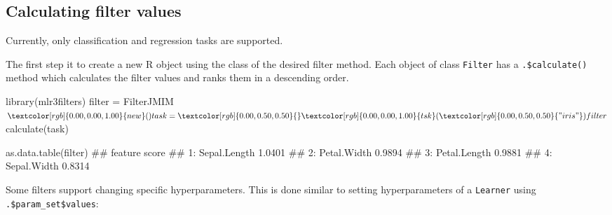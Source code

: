 \documentclass[
  11pt,
  parskip=half,
  DIV=calc,
  BCOR=10mm,
  x11names]{scrbook}
\newenvironment{Shaded}{}{}
\newcommand{\KeywordTok}[1]{\textcolor[rgb]{0.00,0.00,1.00}{#1}}
\newcommand{\NormalTok}[1]{#1}
\newcommand{\OperatorTok}[1]{#1}
\newcommand{\StringTok}[1]{\textcolor[rgb]{0.00,0.50,0.50}{#1}}
\begin{document}
\hypertarget{fs-calc}{%
\subsection{Calculating filter values}\label{fs-calc}}

Currently, only classification and regression tasks are supported.

The first step it to create a new R object using the class of the desired filter method.
Each object of class \texttt{Filter} has a \texttt{.\$calculate()} method which calculates the filter values and ranks them in a descending order.

\begin{Shaded}
\begin{Highlighting}[]
\KeywordTok{library}\NormalTok{(mlr3filters)}
\NormalTok{filter =}\StringTok{ }\NormalTok{FilterJMIM}\OperatorTok{$}\KeywordTok{new}\NormalTok{()}

\NormalTok{task =}\StringTok{ }\KeywordTok{tsk}\NormalTok{(}\StringTok{"iris"}\NormalTok{)}
\NormalTok{filter}\OperatorTok{$}\KeywordTok{calculate}\NormalTok{(task)}

\KeywordTok{as.data.table}\NormalTok{(filter)}
\NormalTok{##         feature  score}
\NormalTok{## 1: Sepal.Length 1.0401}
\NormalTok{## 2:  Petal.Width 0.9894}
\NormalTok{## 3: Petal.Length 0.9881}
\NormalTok{## 4:  Sepal.Width 0.8314}
\end{Highlighting}
\end{Shaded}

Some filters support changing specific hyperparameters.
This is done similar to setting hyperparameters of a \texttt{Learner} using \texttt{.\$param\_set\$values}:
\end{document}
